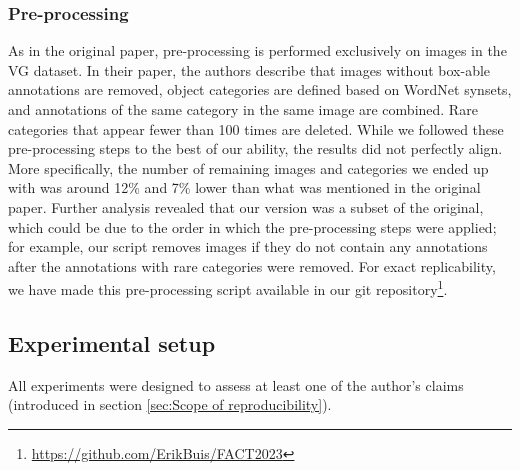 \subsubsection{Pre-processing} \label{sec:Pre-processing}
As in the original paper, pre-processing is performed exclusively on images in the VG dataset. In their paper, the authors describe that images without box-able annotations are removed, object categories are defined based on WordNet \cite{Fellbaum1998} synsets, and annotations of the same category in the same image are combined. Rare categories that appear fewer than 100 times are deleted. While we followed these pre-processing steps to the best of our ability, the results did not perfectly align. More specifically, the number of remaining images and categories we ended up with was around 12\% and 7\% lower than what was mentioned in the original paper. Further analysis revealed that our version was a subset of the original, which could be due to the order in which the pre-processing steps were applied; for example, our script removes images if they do not contain any annotations after the annotations with rare categories were removed. For exact replicability, we have made this pre-processing script available in our git repository\footnote{\url{https://github.com/ErikBuis/FACT2023}}.

\subsection{Experimental setup} \label{sec:Experimental setup}
All experiments were designed to assess at least one of the author's claims (introduced in section \ref{sec:Scope of reproducibility}).

